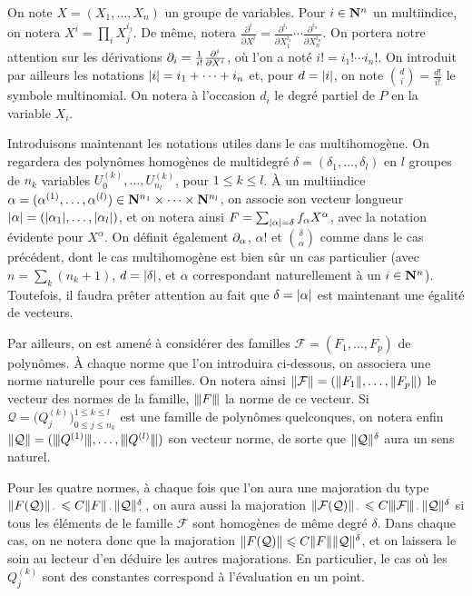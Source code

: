 On note $X = (X_1, \dots, X_n)$ un groupe de variables. Pour $i \in {\mathbf{N}}^n$ un
multiindice, on notera $X^i = \prod_i X_j^{i_j}$. De même, notera
$\frac{\partial^i}{\partial X^i} = \frac{\partial^{i_1}}{\partial
  X_1^{i_1}}\cdots\frac{\partial^{i_n}}{\partial X_n^{i_n}}$. On portera notre
attention sur les dérivations $\partial_{i} = \frac1{i!}\frac{\partial^i}{\partial
  X^i}$, où l'on a noté $i! = i_1! \cdots i_n!$. On introduit par ailleurs les
notations $\lvert i\rvert = i_1 + \dots + i_n$ et, pour $d = \lvert i\rvert$, on note
$\binom{d}{i} = \frac{d!}{i!}$ le symbole multinomial. On notera à l'occasion
$d_i$ le degré partiel de $P$ en la variable $X_i$.

Introduisons maintenant les notations utiles dans le cas multihomogène. On
regardera des polynômes homogènes de multidegré $\delta = (\delta_1, \dots,
\delta_l)$ en $l$ groupes de $n_k$ variables $U_0^{(k)}, \dots,
U_{n_l}^{(k)}$, pour $1\le k \le l$. À un multiindice $\alpha =
(\alpha^{(1)}, \dots, \alpha^{(l)}) \in {\mathbf{N}}^{n_1} \times \dots \times
{\mathbf{N}}^{n_l}$, on associe son vecteur longueur $\lvert\alpha\rvert =
(\lvert\alpha_1\rvert,\dots, \lvert\alpha_l\rvert)$, et on notera ainsi $F =
\sum_{\lvert\alpha\rvert = \delta} f_\alpha X^\alpha$, avec la notation évidente pour
$X^\alpha$. On définit également $\partial_{\alpha}$, $\alpha!$ et
$\binom{\delta}{\alpha}$ comme dans le cas précédent, dont le cas
multihomogène est bien sûr un cas particulier (avec $n = \sum_k (n_k + 1)$,
$d = \lvert\delta\rvert$, et $\alpha$ correspondant naturellement à un $i \in {\mathbf{N}}^n$).
Toutefois, il faudra prêter attention au fait que $\delta = \lvert\alpha\rvert$ est
maintenant une égalité de vecteurs.

Par ailleurs, on est amené à considérer des familles $\mathcal F = (F_1,
\dots, F_p)$ de polynômes. À chaque norme que l'on introduira ci-dessous,
on associera une norme naturelle pour ces familles. On notera
ainsi $\lVert\mathcal F\rVert = (\lVert F_1\rVert, \ldots, \lVert F_p\rVert)$ le vecteur des
normes de la famille, $\nnorm F$ la norme de ce vecteur. Si $\mathcal Q =
\big(Q_j^{(k)}\big)_{0 \le j \le n_k}^{1 \le k \le l}$ est une famille de
polynômes quelconques, on notera enfin $\norm{\mathcal Q} =
(\nnorm{\smash{Q^{(1)}}}, \ldots, \nnorm{\smash{Q^{(l)}}})$ son vecteur norme,
de sorte que $\lVert\mathcal Q\rVert ^\delta$ aura un sens naturel.

Pour les quatre normes, à chaque fois que l'on aura une majoration du type
$\lVert F(\mathcal Q)\rVert_{\,\cdot\,} \leqslant C \lVert F\rVert _{\,\cdot\,} \lVert\mathcal
  Q\rVert_{\,\cdot\,}^\delta$, on aura aussi la majoration $\norm{\mathcal F(\mathcal
  Q)}_\truc \le C \nnorm{\mathcal F}_\truc \norm{\mathcal Q}^\delta$ si tous
les éléments de le famille $\mathcal F$ sont homogènes de même degré $\delta$.
Dans chaque cas, on ne notera donc que la majoration $\lVert F(\mathcal Q)\rVert \leqslant
C \lVert F\rVert \lVert\mathcal Q\rVert^\delta$, et on laissera le soin au lecteur d'en
déduire les autres majorations. En particulier, le cas où les $Q_j^{(k)}$ sont
des constantes correspond à l'évaluation en un point.

